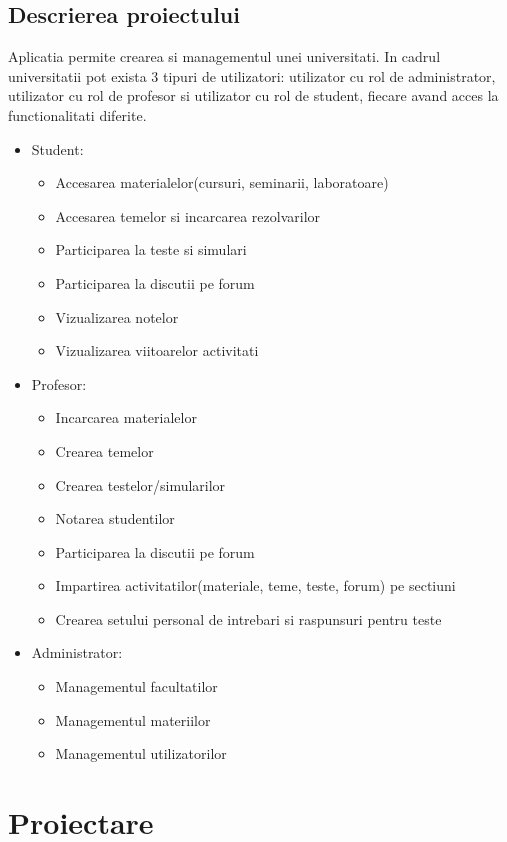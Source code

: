 \documentclass[12pt, a4paper, oneside, romanian]{teza-upb}
\begin{document}
\section{Descrierea proiectului}

Aplicatia permite crearea si managementul unei universitati. In cadrul universitatii pot exista 3 tipuri de utilizatori: utilizator cu rol de administrator, utilizator cu rol de profesor si utilizator cu rol de student, fiecare avand acces la functionalitati diferite.
\begin{itemize}
	\item Student:
		\begin{itemize}
			\item Accesarea materialelor(cursuri, seminarii, laboratoare)
			\item Accesarea temelor si incarcarea rezolvarilor
			\item Participarea la teste si simulari
			\item Participarea la discutii pe forum
			\item Vizualizarea notelor
			\item Vizualizarea viitoarelor activitati
		\end{itemize}
	\item Profesor:
		\begin{itemize}
			\item Incarcarea materialelor
			\item Crearea temelor
			\item Crearea testelor/simularilor
			\item Notarea studentilor
			\item Participarea la discutii pe forum
			\item Impartirea activitatilor(materiale, teme, teste, forum) pe sectiuni
			\item Crearea setului personal de intrebari si raspunsuri pentru teste
		\end{itemize}
	\item Administrator:
		\begin{itemize}
			\item Managementul facultatilor
			\item Managementul materiilor
			\item Managementul utilizatorilor
		\end{itemize}
\end{itemize}

\chapter{Proiectare}
\end{document}
